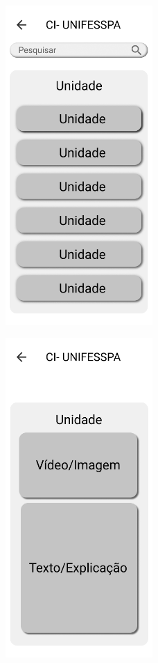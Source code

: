 \begin{apendicesenv}
\begin{figure}[H]
    \centering
    \includegraphics[width=0.5\textwidth]{figuras/Apêndice A/Unity-module.png}
\end{figure}

\begin{figure}[H]
    \centering
    \includegraphics[width=0.5\textwidth]{figuras/Apêndice A/Unity-info.png}
\end{figure}


\end{apendicesenv}
